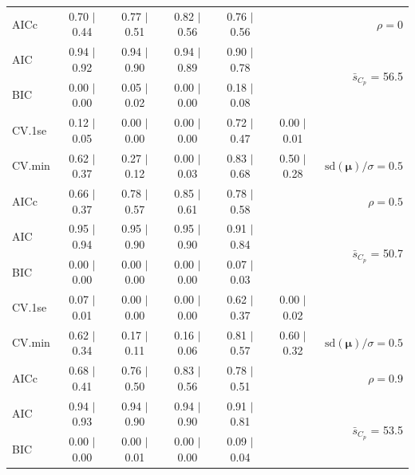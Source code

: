 \documentclass[12pt]{article}
\newcommand{\mr}[1]{\mathrm{#1}}
\newcommand{\bm}[1]{\mathbf{#1}}
\begin{document}
\begin{table}[p]
\begin{center}
\begin{tabular}{l*{5}{c}|r}
AICc & 0.70 $\mid$ 0.44 & 0.77 $\mid$ 0.51 & 0.82 $\mid$ 0.56 & 0.76 $\mid$ 0.56 & & $\rho=0$ \\
AIC & 0.94 $\mid$ 0.92 & 0.94 $\mid$ 0.90 & 0.94 $\mid$ 0.89 & 0.90 $\mid$ 0.78 & & \multirow{2}{*}{$\bar{s}_{C_p}$ = 56.5} \\
BIC & 0.00 $\mid$ 0.00 & 0.05 $\mid$ 0.02 & 0.00 $\mid$ 0.00 & 0.18 $\mid$ 0.08 & & \\
 \hline 
CV.1se & 0.12 $\mid$ 0.05 & 0.00 $\mid$ 0.00 & 0.00 $\mid$ 0.00 & 0.72 $\mid$ 0.47 & 0.00 $\mid$ 0.01 &\\
CV.min & 0.62 $\mid$ 0.37 & 0.27 $\mid$ 0.12 & 0.00 $\mid$ 0.03 & 0.83 $\mid$ 0.68 & 0.50 $\mid$ 0.28 &  $\mr{sd}(\bm{\mu})/\sigma=0.5$ \\
AICc & 0.66 $\mid$ 0.37 & 0.78 $\mid$ 0.57 & 0.85 $\mid$ 0.61 & 0.78 $\mid$ 0.58 & & $\rho=0.5$ \\
AIC & 0.95 $\mid$ 0.94 & 0.95 $\mid$ 0.90 & 0.95 $\mid$ 0.90 & 0.91 $\mid$ 0.84 & & \multirow{2}{*}{$\bar{s}_{C_p}$ = 50.7} \\
BIC & 0.00 $\mid$ 0.00 & 0.00 $\mid$ 0.00 & 0.00 $\mid$ 0.00 & 0.07 $\mid$ 0.03 & & \\
 \hline 
CV.1se & 0.07 $\mid$ 0.01 & 0.00 $\mid$ 0.00 & 0.00 $\mid$ 0.00 & 0.62 $\mid$ 0.37 & 0.00 $\mid$ 0.02 &\\
CV.min & 0.62 $\mid$ 0.34 & 0.17 $\mid$ 0.11 & 0.16 $\mid$ 0.06 & 0.81 $\mid$ 0.57 & 0.60 $\mid$ 0.32 &  $\mr{sd}(\bm{\mu})/\sigma=0.5$ \\
AICc & 0.68 $\mid$ 0.41 & 0.76 $\mid$ 0.50 & 0.83 $\mid$ 0.56 & 0.78 $\mid$ 0.51 & & $\rho=0.9$ \\
AIC & 0.94 $\mid$ 0.93 & 0.94 $\mid$ 0.90 & 0.94 $\mid$ 0.90 & 0.91 $\mid$ 0.81 & & \multirow{2}{*}{$\bar{s}_{C_p}$ = 53.5} \\
BIC & 0.00 $\mid$ 0.00 & 0.00 $\mid$ 0.01 & 0.00 $\mid$ 0.00 & 0.09 $\mid$ 0.04 & & \\
 \hline 
 \end{tabular}
\end{center}
\vspace{-1cm}
\end{table}
\end{document}
